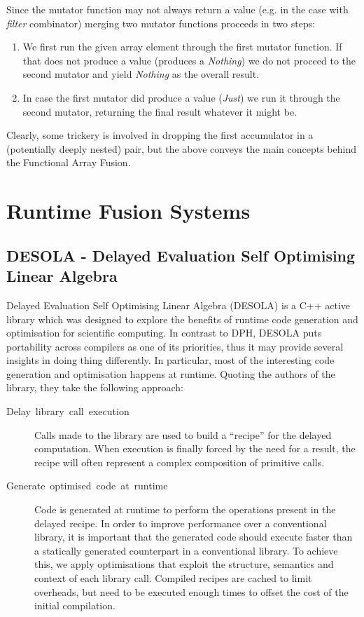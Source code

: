 \documentclass[preamble.tex]{subfiles}
\begin{document}
Since the mutator function may not always return a value (e.g. in the case with \emph{filter} combinator) merging two mutator functions proceeds in two steps:
\begin{enumerate}
\item We first run the given array element through the first mutator function. If that does not produce a value (produces a \emph{Nothing}) we do not proceed to the second mutator and yield \emph{Nothing} as the overall result.
\item In case the first mutator did produce a value (\emph{Just}) we run it through the second mutator, returning the final result whatever it might be.
\end{enumerate}
Clearly, some trickery is involved in dropping the first accumulator in a (potentially deeply nested) pair, but the above conveys the main concepts behind the Functional Array Fusion.


\section{Runtime Fusion Systems}

\subsection{DESOLA - Delayed Evaluation Self Optimising Linear Algebra}

Delayed Evaluation Self Optimising Linear Algebra (DESOLA) \cite{RMKB06} is a C++ active library which was designed to explore the benefits of runtime code generation and optimisation for scientific computing. In contrast to DPH, DESOLA puts portability across compilers as one of its priorities, thus it may provide several insights in doing thing differently. In particular, most of the interesting code generation and optimisation happens at runtime. Quoting the authors of the library, they take the following approach:

\begin{description}
\item [{Delay~library~call~execution}] Calls made to the library are used to build a “recipe” for the delayed computation. When execution is finally forced by the need for a result, the recipe will often represent a complex composition of primitive calls.
\item [{Generate~optimised~code~at~runtime}] Code is generated at runtime to perform the operations present in the delayed recipe. In order to improve performance over a conventional library, it is important that the generated code should execute faster than a statically generated counterpart in a conventional library. To achieve this, we apply optimisations that exploit the structure, semantics and context of each library call. Compiled recipes are cached to limit overheads, but need to be executed enough times to offset the cost of the initial compilation.
\end{description}
\end{document}
